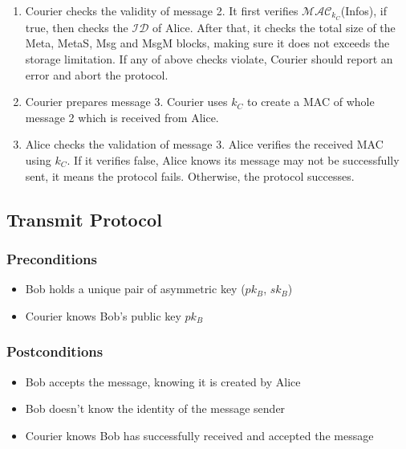 \begin{enumerate}
\item Courier checks the validity of message 2. It first verifies $ \mathcal{MAC}_{k_C} $(Infos), if true, then checks the $ \mathcal{ID} $ of Alice. After that, it checks the total size of the Meta, MetaS, Msg and MsgM blocks, making sure it does not exceeds the storage limitation. If any of above checks violate, Courier should report an error and abort the protocol.

\item Courier prepares message 3. Courier uses $ k_C $ to create a MAC of whole message 2 which is received from Alice. 

\item Alice checks the validation of message 3. Alice verifies the received MAC using $ k_C $. If it verifies false, Alice knows its message may not be successfully sent, it means the protocol fails. Otherwise, the protocol successes.
\end{enumerate}

\pagebreak
\subsection{Transmit Protocol}
\subsubsection{Preconditions}
\begin{itemize}
\item Bob holds a unique pair of asymmetric key ($pk_B$, $sk_B$)
\item Courier knows Bob's public key $pk_B$
\end{itemize}
\subsubsection{Postconditions}
\begin{itemize}
\item Bob accepts the message, knowing it is created by Alice
\item Bob doesn't know the identity of the message sender
\item Courier knows Bob has successfully received and accepted the message
\end{itemize}
